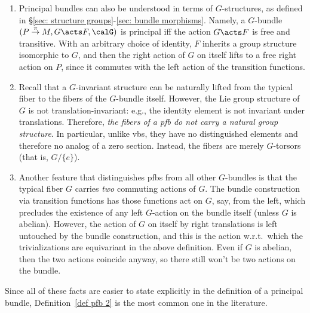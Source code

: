 \begin{rem}
    \begin{enumerate}
        \item Principal bundles can also be understood in terms of $G$-structures, as defined in \S\ref{sec: structure groups}-\ref{sec: bundle morphisms}. Namely, a $G$-bundle $(P\overset{\pi}{\to}M,G\acts F,\calG)$ is principal iff the action $G\acts F$ is free and transitive. With an arbitrary choice of identity, $F$ inherits a group structure isomorphic to $G$, and then the right action of $G$ on itself lifts to a free right action on $P$, since it commutes with the left action of the transition functions.
        
        \item Recall that a $G$-invariant structure can be naturally lifted from the typical fiber to the fibers of the $G$-bundle itself. However, the Lie group structure of $G$ is not translation-invariant: e.g., the identity element is not invariant under translations. Therefore, \emph{the fibers of a \gls{pfb} do not carry a natural group structure}. In particular, unlike \glspl{vb}, they have no distinguished elements and therefore no analog of a zero section. Instead, the fibers are merely $G$-torsors (that is, $G\slash \{e\}$).

        \item Another feature that distinguishes \glspl{pfb} from all other $G$-bundles is that the typical fiber $G$ carries \emph{two} commuting actions of $G$. The bundle construction via transition functions has those functions act on $G$, say, from the left, which precludes the existence of any left $G$-action on the bundle itself (unless $G$ is abelian). However, the action of $G$ on itself by right translations is left untouched by the bundle construction, and this is the action w.r.t.\ which the trivializations are equivariant in the above definition. Even if $G$ is abelian, then the two actions coincide anyway, so there still won't be two actions on the bundle.
    \end{enumerate}
    Since all of these facts are easier to state explicitly in the definition of a principal bundle, Definition~\ref{def pfb 2} is the most common one in the literature.
\end{rem}




